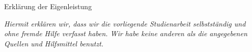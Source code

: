 \pagebreak
\hspace{0pt}
\vfill
\begin{center}
    \large{Erklärung der Eigenleistung}
\end{center}
\vspace{1em}
\begin{center}
    \textit{Hiermit erklären wir, dass wir die vorliegende Studienarbeit selbstständig und ohne fremde Hilfe verfasst haben. Wir habe keine anderen als die angegebenen Quellen und Hilfsmittel benutzt.}
\end{center}
\vfill
\hspace{0pt}
\pagebreak
